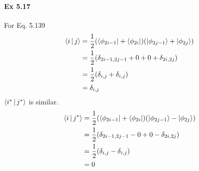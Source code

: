 \documentclass[a4paper]{article}
\newcommand{\ex}[1]{\paragraph{Ex #1}}
\numberwithin{equation}{subsection}
\begin{document}
\ex{5.17}
For Eq. 5.139
\begin{align}
\Braket{i|j} &= \dfrac{1}{2}\qty(\bra{\phi_{2i-1}} + \bra{\phi_{2i}}) \qty(\ket{\phi_{2j-1}} + \ket{\phi_{2j}}) \notag\\
&= \dfrac{1}{2}\qty(\delta_{2i-1,2j-1} + 0 + 0 + \delta_{2i,2j}) \notag\\
&= \dfrac{1}{2}\qty(\delta_{i,j} + \delta_{i,j}) \notag\\
&= \delta_{i,j}
\end{align}
$ \Braket{i^*|j^*} $ is similar.
\begin{align}
\Braket{i|j^*} &= \dfrac{1}{2}\qty(\bra{\phi_{2i-1}} + \bra{\phi_{2i}}) \qty(\ket{\phi_{2j-1}} - \ket{\phi_{2j}}) \notag\\
&= \dfrac{1}{2}\qty(\delta_{2i-1,2j-1} - 0 + 0 - \delta_{2i,2j}) \notag\\
&= \dfrac{1}{2}\qty(\delta_{i,j} - \delta_{i,j}) \notag\\
&= 0
\end{align}
\end{document}
